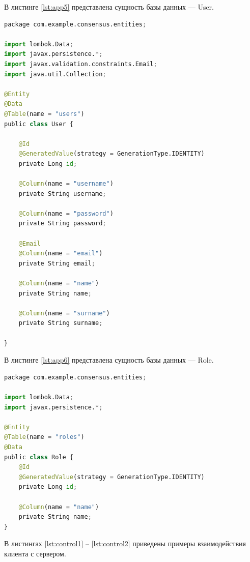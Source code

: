 В листинге \ref{lst:app5} представлена сущность базы данных --- User.

\begin{lstlisting}[label=lst:app5, caption=Сущность User, language=python]
package com.example.consensus.entities;

import lombok.Data;
import javax.persistence.*;
import javax.validation.constraints.Email;
import java.util.Collection;

@Entity
@Data
@Table(name = "users")
public class User {

	@Id
	@GeneratedValue(strategy = GenerationType.IDENTITY)
	private Long id;

	@Column(name = "username")
	private String username;

	@Column(name = "password")
	private String password;

	@Email
	@Column(name = "email")
	private String email;

	@Column(name = "name")
	private String name;

	@Column(name = "surname")
	private String surname;

}
\end{lstlisting}

В листинге \ref{lst:app6} представлена сущность базы данных --- Role.

\begin{lstlisting}[label=lst:app6, caption=Сущность Role, language=python]
package com.example.consensus.entities;

import lombok.Data;
import javax.persistence.*;

@Entity
@Table(name = "roles")
@Data
public class Role {
	@Id
	@GeneratedValue(strategy = GenerationType.IDENTITY)
	private Long id;

	@Column(name = "name")
	private String name;
}	
\end{lstlisting}

В листингах \ref{lst:control1} -- \ref{lst:control2} приведены примеры взаимодействия клиента с сервером.

